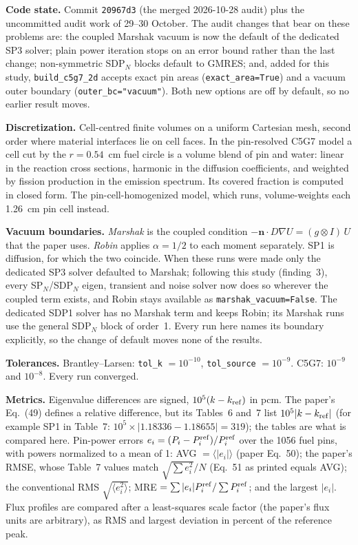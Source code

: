\documentclass[a4paper,10pt]{article}
\newcommand{\code}[1]{\texttt{#1}}
\begin{document}
\textbf{Code state.} Commit \code{20967d3} (the merged 2026-10-28 audit)
plus the uncommitted audit work of 29--30 October. The audit changes that
bear on these problems are: the coupled Marshak vacuum is now the default of
the dedicated SP3 solver; plain power iteration stops on an error bound
rather than the last change; non-symmetric SDP$_N$ blocks default to GMRES;
and, added for this study, \code{build\_c5g7\_2d} accepts exact pin areas
(\code{exact\_area=True}) and a vacuum outer boundary
(\code{outer\_bc="vacuum"}). Both new options are off by default, so no
earlier result moves.

\textbf{Discretization.} Cell-centred finite volumes on a uniform Cartesian
mesh, second order where material interfaces lie on cell faces. In the
pin-resolved C5G7 model a cell cut by the $r = 0.54$~cm fuel circle is a
volume blend of pin and water: linear in the reaction cross sections,
harmonic in the diffusion coefficients, and weighted by fission production
in the emission spectrum. Its covered fraction is computed in closed form.
The pin-cell-homogenized model, which 
runs, volume-weights each 1.26~cm pin cell instead.

\textbf{Vacuum boundaries.} \emph{Marshak} is the coupled condition
$-\mathbf{n}\cdot D\nabla U = (g \otimes I)\,U$ that the paper uses.
\emph{Robin} applies $\alpha = 1/2$ to each moment separately. SP1 is
diffusion, for which the two coincide. When these runs were made only the
dedicated SP3 solver defaulted to Marshak; following this study (finding~3),
every SP$_N$/SDP$_N$ eigen, transient and noise solver now does so wherever
the coupled term exists, and Robin stays available as
\code{marshak\_vacuum=False}. The dedicated SDP1 solver has no Marshak term
and keeps Robin; its Marshak runs use the general SDP$_N$ block of order~1.
Every run here names its boundary explicitly, so the change of default moves
none of the results.

\textbf{Tolerances.} Brantley--Larsen: \code{tol\_k} $= 10^{-10}$,
\code{tol\_source} $= 10^{-9}$. C5G7: $10^{-9}$ and $10^{-8}$. Every run
converged.

\textbf{Metrics.} Eigenvalue differences are signed,
$10^5 (k - k_{\rm ref})$ in pcm. The paper's Eq.~(49) defines a relative
difference, but its Tables~6 and~7 list $10^5 |k - k_{\rm ref}|$ (for
example SP1 in Table~7: $10^5 \times |1.18336 - 1.18655| = 319$); the
tables are what is compared here. Pin-power errors
$e_i = (P_i - P_i^{\rm ref})/P_i^{\rm ref}$ over the 1056 fuel pins, with
powers normalized to a mean of 1: AVG $= \langle |e_i| \rangle$ (paper
Eq.~50); the paper's RMSE, whose Table~7 values match
$\sqrt{\sum e_i^2}/N$ (Eq.~51 as printed equals AVG); the conventional RMS
$\sqrt{\langle e_i^2 \rangle}$; MRE $= \sum |e_i| P_i^{\rm ref} / \sum
P_i^{\rm ref}$; and the largest $|e_i|$. Flux profiles are compared after a
least-squares scale factor (the paper's flux units are arbitrary), as RMS and
largest deviation in percent of the reference peak.
\end{document}
